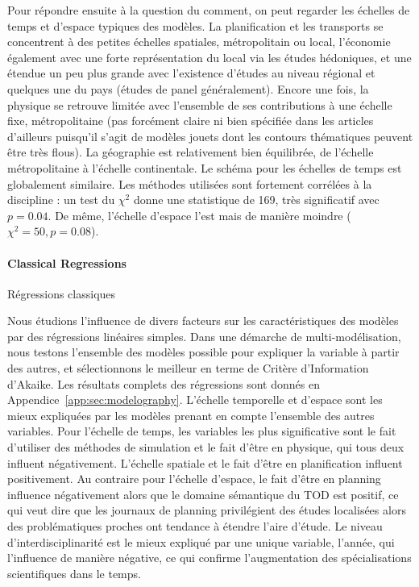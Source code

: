 Pour répondre ensuite à la question du comment, on peut regarder les échelles de temps et d'espace typiques des modèles. La planification et les transports se concentrent à des petites échelles spatiales, métropolitain ou local, l'économie également avec une forte représentation du local via les études hédoniques, et une étendue un peu plus grande avec l'existence d'études au niveau régional et quelques une du pays (études de panel généralement). Encore une fois, la physique se retrouve limitée avec l'ensemble de ses contributions à une échelle fixe, métropolitaine (pas forcément claire ni bien spécifiée dans les articles d'ailleurs puisqu'il s'agit de modèles jouets dont les contours thématiques peuvent être très flous). La géographie est relativement bien équilibrée, de l'échelle métropolitaine à l'échelle continentale. Le schéma pour les échelles de temps est globalement similaire. Les méthodes utilisées sont fortement corrélées à la discipline : un test du $\chi^2$ donne une statistique de 169, très significatif avec $p=0.04$. De même, l'échelle d'espace l'est mais de manière moindre ($\chi^2 = 50, p = 0.08$).


\paragraph{Classical Regressions}{Régressions classiques}

Nous étudions l'influence de divers facteurs sur les caractéristiques des modèles par des régressions linéaires simples. Dans une démarche de multi-modélisation, nous testons l'ensemble des modèles possible pour expliquer la variable à partir des autres, et sélectionnons le meilleur en terme de Critère d'Information d'Akaike. Les résultats complets des régressions sont donnés en Appendice~\ref{app:sec:modelography}. L'échelle temporelle et d'espace sont les mieux expliquées par les modèles prenant en compte l'ensemble des autres variables. Pour l'échelle de temps, les variables les plus significative sont le fait d'utiliser des méthodes de simulation et le fait d'être en physique, qui tous deux influent négativement. L'échelle spatiale et le fait d'être en planification influent positivement. Au contraire pour l'échelle d'espace, le fait d'être en planning influence négativement alors que le domaine sémantique du TOD est positif, ce qui veut dire que les journaux de planning privilégient des études localisées alors des problématiques proches ont tendance à étendre l'aire d'étude. Le niveau d'interdisciplinarité est le mieux expliqué par une unique variable, l'année, qui l'influence de manière négative, ce qui confirme l'augmentation des spécialisations scientifiques dans le temps. 


